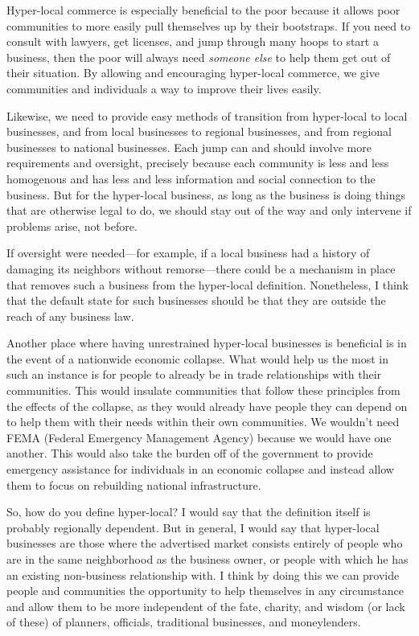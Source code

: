 Hyper-local commerce
is especially beneficial to the poor because it allows poor communities
to more easily pull themselves up by their bootstraps. If you need to
consult with lawyers, get licenses, and jump through many hoops to
start a business, then the poor will always need \textit{someone else}
to help them get out of their situation. By allowing and encouraging
hyper-local commerce, we give communities and individuals a way to
improve their lives easily.

Likewise, we need to provide easy methods of transition from hyper-local
to local businesses, and from local businesses to regional businesses,
and from regional businesses to national businesses. Each jump can and
should involve more requirements and oversight, precisely because each
community is less and less homogenous and has less and less information
and social connection to the business. But for the hyper-local
business, as long as the business is doing things that are otherwise
legal to do, we should stay out of the way and only intervene if
problems arise, not before.

If oversight were
needed—for example, if a local business had a history of damaging its
neighbors without remorse—there could be a mechanism in place that
removes such a business from the hyper-local definition.  Nonetheless,
I think that the default state for such businesses should be that they
are outside the reach of any business law. 

Another place where having unrestrained hyper-local businesses is
beneficial is in the event of a nationwide economic collapse. What
would help us the
most in such an
instance is for people to already be in trade relationships with their
communities.  This
would insulate
communities that follow these principles from the effects
of the collapse, as
they would already
have people they can depend on
to help them with
their needs within their own communities. We
wouldn’t need FEMA
(Federal Emergency Management Agency) because we
would have one
another. This would
also take the burden off of the government to provide emergency
assistance for individuals in an economic collapse and instead allow
them to focus on rebuilding national
infrastructure.

So, how do you define hyper-local?  I would say that the definition
itself is probably regionally dependent. But in general, I would say
that hyper-local
businesses are those
where the advertised market consists entirely of people who are in the
same neighborhood as the business owner, or people with which he has an
existing non-business relationship with. I think by doing this we can
provide people and communities the opportunity to help themselves in
any circumstance and allow them to be more independent of the fate,
charity, and wisdom (or lack of these) of planners, officials,
traditional businesses, and moneylenders.
